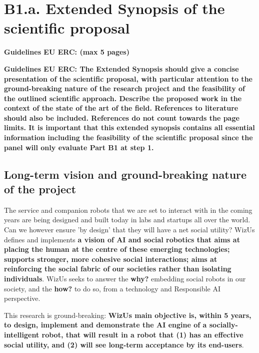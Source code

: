 \documentclass[11pt,a4paper]{report}
\newcommand{\project}{WizUs\xspace}
\newcommand{\eu}[1]{{\color{teal}\textbf{Guidelines EU ERC: #1}}}
\begin{document}

\chapter{B1.a. Extended Synopsis of the scientific proposal}\label{part1}

\eu{(max 5 pages)}

\eu{The Extended Synopsis should give a concise presentation of the scientific
proposal, with particular attention to the ground-breaking nature of the
research project and the feasibility of the outlined scientific approach.
Describe the proposed work in the context of the state of the art of the field.
References to literature should also be included. References do not count
towards the page limits. It is important that this extended synopsis contains
all essential information including the feasibility of the scientific proposal
since the panel will only evaluate Part B1 at step 1.}

\section{Long-term vision and ground-breaking nature of the project}

The service and companion robots that we are set to interact with in the coming
years are being designed and built today in labs and startups all over the
world. Can we however ensure 'by design' that they will have a net social utility?
\project defines and implements \textbf{a vision of AI
and social robotics that aims at placing the human at the centre of these
emerging technologies; supports stronger, more cohesive social interactions;
aims at reinforcing the social fabric of our societies rather than isolating
individuals}. \project seeks to answer the \textbf{why?} embedding social robots
in our society, and the \textbf{how?} to do so, from a technology and
Responsible AI perspective.

This research is ground-breaking: \textbf{\project main objective is, within 5
years, to design, implement and demonstrate the AI engine of a
socially-intelligent robot, that will result in a robot that (1) has an
effective social utility, and (2) will see long-term acceptance by its
end-users}.
\end{document}
